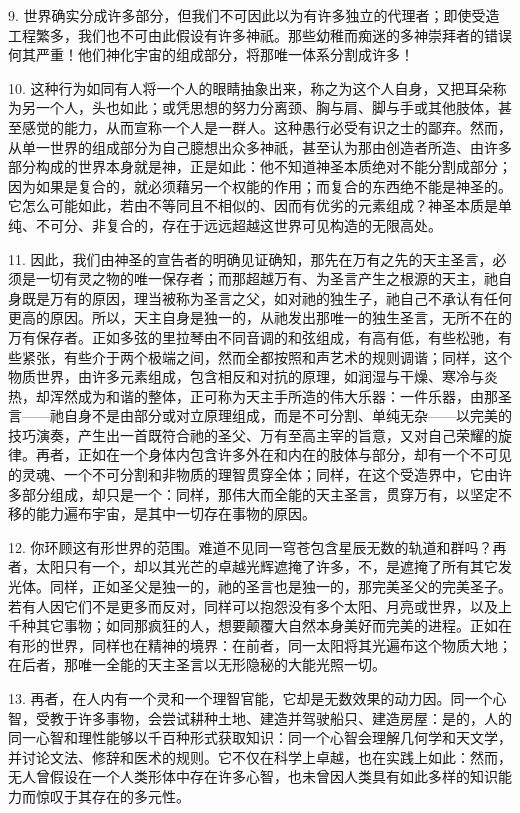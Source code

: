 9. 世界确实分成许多部分，但我们不可因此以为有许多独立的代理者；即使受造工程繁多，我们也不可由此假设有许多神祇。那些幼稚而痴迷的多神崇拜者的错误何其严重！他们神化宇宙的组成部分，将那唯一体系分割成许多！\par

10. 这种行为如同有人将一个人的眼睛抽象出来，称之为这个人自身，又把耳朵称为另一个人，头也如此；或凭思想的努力分离颈、胸与肩、脚与手或其他肢体，甚至感觉的能力，从而宣称一个人是一群人。这种愚行必受有识之士的鄙弃。然而，从单一世界的组成部分为自己臆想出众多神祇，甚至认为那由创造者所造、由许多部分构成的世界本身就是神，正是如此：他不知道神圣本质绝对不能分割成部分；因为如果是复合的，就必须藉另一个权能的作用；而复合的东西绝不能是神圣的。它怎么可能如此，若由不等同且不相似的、因而有优劣的元素组成？神圣本质是单纯、不可分、非复合的，存在于远远超越这世界可见构造的无限高处。\par

11. 因此，我们由神圣的宣告者的明确见证确知，那先在万有之先的天主圣言，必须是一切有灵之物的唯一保存者；而那超越万有、为圣言产生之根源的天主，祂自身既是万有的原因，理当被称为圣言之父，如对祂的独生子，祂自己不承认有任何更高的原因。所以，天主自身是独一的，从祂发出那唯一的独生圣言，无所不在的万有保存者。正如多弦的里拉琴由不同音调的和弦组成，有高有低，有些松驰，有些紧张，有些介于两个极端之间，然而全都按照和声艺术的规则调谐；同样，这个物质世界，由许多元素组成，包含相反和对抗的原理，如润湿与干燥、寒冷与炎热，却浑然成为和谐的整体，正可称为天主手所造的伟大乐器：一件乐器，由那圣言——祂自身不是由部分或对立原理组成，而是不可分割、单纯无杂——以完美的技巧演奏，产生出一首既符合祂的圣父、万有至高主宰的旨意，又对自己荣耀的旋律。再者，正如在一个身体内包含许多外在和内在的肢体与部分，却有一个不可见的灵魂、一个不可分割和非物质的理智贯穿全体；同样，在这个受造界中，它由许多部分组成，却只是一个：同样，那伟大而全能的天主圣言，贯穿万有，以坚定不移的能力遍布宇宙，是其中一切存在事物的原因。\par

12. 你环顾这有形世界的范围。难道不见同一穹苍包含星辰无数的轨道和群吗？再者，太阳只有一个，却以其光芒的卓越光辉遮掩了许多，不，是遮掩了所有其它发光体。同样，正如圣父是独一的，祂的圣言也是独一的，那完美圣父的完美圣子。若有人因它们不是更多而反对，同样可以抱怨没有多个太阳、月亮或世界，以及上千种其它事物；如同那疯狂的人，想要颠覆大自然本身美好而完美的进程。正如在有形的世界，同样也在精神的境界：在前者，同一太阳将其光遍布这个物质大地；在后者，那唯一全能的天主圣言以无形隐秘的大能光照一切。\par

13. 再者，在人内有一个灵和一个理智官能，它却是无数效果的动力因。同一个心智，受教于许多事物，会尝试耕种土地、建造并驾驶船只、建造房屋：是的，人的同一心智和理性能够以千百种形式获取知识：同一个心智会理解几何学和天文学，并讨论文法、修辞和医术的规则。它不仅在科学上卓越，也在实践上如此：然而，无人曾假设在一个人类形体中存在许多心智，也未曾因人类具有如此多样的知识能力而惊叹于其存在的多元性。\par

